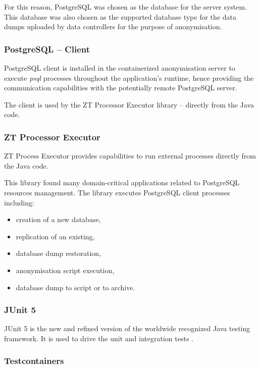 \documentclass[a4paper,twoside,12pt]{book}
\begin{document}
For this reason, PostgreSQL was chosen as the database for the server system. This database was also chosen as the supported database type for the data dumps uploaded by data controllers for the purpose of anonymisation.


\subsubsection{PostgreSQL – Client}

PostgreSQL client is installed in the containerized anonymisation server to execute \textit{psql} processes throughout the application's runtime, hence providing the communication capabilities with the potentially remote PostgreSQL server.

The client is used by the ZT Processor Executor library – directly from the Java code.

\subsubsection{ZT Processor Executor}

ZT Process Executor provides capabilities to run external processes directly from the Java code.

This library found many domain-critical applications related to PostgreSQL resources management. The library executes PostgreSQL client processes including:
\begin{itemize}
\item creation of a new database,
\item replication of an existing,
\item database dump restoration,
\item anonymisation script execution,
\item database dump to script or to archive.
\end{itemize}

\subsubsection{JUnit 5}

JUnit 5 is the new and refined version of the worldwide recognized Java testing framework. It is used to drive the unit and integration tests \cite{bib:junit_in_action}.


\subsubsection{Testcontainers}
\end{document}
